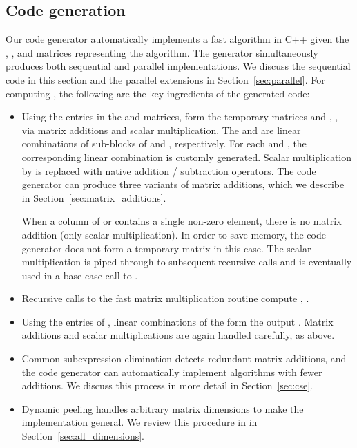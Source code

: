 \documentclass[preprint]{sigplanconf}
\begin{document}
\label{sec:implementation}

\subsection{Code generation}
\label{sec:codegen}

Our code generator automatically implements a fast algorithm in C++ given the , , and  matrices representing the algorithm.
The generator simultaneously produces both sequential and parallel implementations.
We discuss the sequential code in this section and the parallel extensions in Section~\ref{sec:parallel}.
For computing , the following are the key ingredients of the generated code:
\begin{itemize}
\item
Using the entries in the  and  matrices, form the temporary matrices  and , , via matrix additions and scalar multiplication.
The  and  are linear combinations of sub-blocks of  and , respectively.
For each  and , the corresponding linear combination is customly generated.
Scalar multiplication by  is replaced with native addition / subtraction operators.
The code generator can produce three variants of matrix additions, which we describe in Section~\ref{sec:matrix_additions}.

When a column of  or  contains a single non-zero element, there is no matrix addition (only scalar multiplication).
In order to save memory, the code generator does not form a temporary matrix in this case.
The scalar multiplication is piped through to subsequent recursive calls and is eventually used in a base case call to .

\item
Recursive calls to the fast matrix multiplication routine compute , .


\item
Using the entries of , linear combinations of the  form the output .
Matrix additions and scalar multiplications are again handled carefully, as above.

\item
Common subexpression elimination detects redundant matrix additions, and the code generator can automatically implement
algorithms with fewer additions.
We discuss this process in more detail in Section~\ref{sec:cse}.

\item
Dynamic peeling handles arbitrary matrix dimensions to make the implementation general.
We review this procedure in in Section~\ref{sec:all_dimensions}.

\end{itemize}
\end{document}
